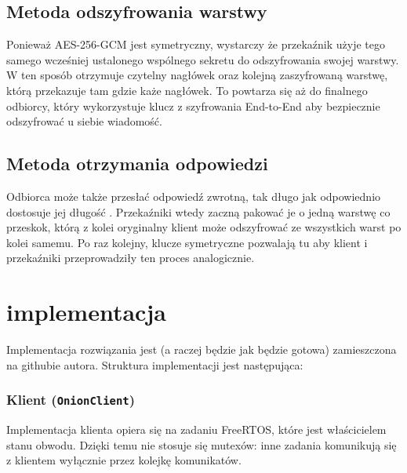 \documentclass[thesis=inz,faculty=ee]{EE-dyplom}
\begin{document}
    \section{Metoda odszyfrowania warstwy}

    Ponieważ AES-256-GCM jest symetryczny, wystarczy że przekaźnik użyje tego samego wcześniej ustalonego wspólnego sekretu do odszyfrowania swojej warstwy. W ten sposób
    otrzymuje czytelny nagłówek oraz kolejną zaszyfrowaną warstwę, którą przekazuje tam gdzie każe nagłówek. To powtarza się aż do finalnego odbiorcy, który wykorzystuje
    klucz z szyfrowania End-to-End aby bezpiecznie odszyfrować u siebie wiadomość.

    \section{Metoda otrzymania odpowiedzi}

    Odbiorca może także przesłać odpowiedź zwrotną, tak długo jak odpowiednio dostosuje jej długość . Przekaźniki wtedy zaczną pakować je o jedną warstwę co przeskok,
    którą z kolei oryginalny klient może odszyfrować ze wszystkich warst po kolei samemu. Po raz kolejny, klucze symetryczne pozwalają tu aby klient i przekaźniki 
    przeprowadziły ten proces analogicznie. 
    
    \chapter{implementacja}

    Implementacja rozwiązania jest (a raczej będzie jak będzie gotowa) zamieszczona na githubie autora. Struktura implementacji jest następująca:

    \subsection{Klient (\texttt{OnionClient})}

    Implementacja klienta opiera się na zadaniu FreeRTOS, które jest właścicielem stanu obwodu. Dzięki temu nie stosuje się mutexów: inne zadania komunikują się z 
    klientem wyłącznie przez kolejkę komunikatów.
\end{document}
